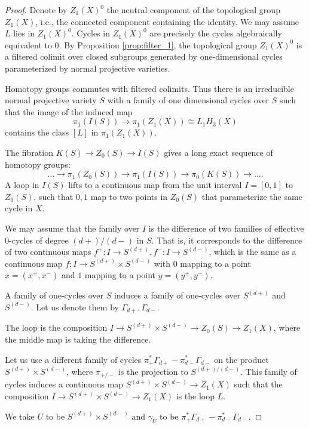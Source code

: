 \documentclass{amsart}
\theoremstyle{definition}
\theoremstyle{remark}
\begin{document}
\begin{proof}
Denote by $Z_1(X)^0$ the neutral component  of the topological group $Z_1(X)$, i.e., the connected component containing the identity.
We may assume $L$ lies in $Z_1(X)^0$.
Cycles in $Z_1(X)^0$ are precisely the cycles algebraically equivalent to $0$.
By Proposition \ref{prop:filter_1}, the topological group $Z_1(X)^0$ is a filtered colimit over closed subgroups generated by one-dimensional cycles parameterized by normal projective varieties.

Homotopy groups commutes with filtered colimits.
Thus there is an irreducible normal projective variety $S$ with a family of one dimensional cycles over $S$ such that the image of the induced map 
\[
 \pi_1(I(S)) \to \pi_1(Z_1(X)) \cong L_1H_{3}(X) 
\] 
contains the class $[L]$ in $\pi_1(Z_1(X))$.

The fibration $K(S) \to Z_0(S) \to I(S)$ gives a long exact sequence of homotopy groups:
\[
\ldots \to \pi_1(Z_0(S)) \to \pi_1(I(
S)) \to \pi_0(K(S)) \to \ldots.
\]
A loop in $I(S)$ lifts to a continuous map from the unit interval $I=[0, 1]$ to $Z_0(S)$, such that $0, 1$ map to two points in $Z_0(S)$ that parameterize the same cycle in $X$.
 
We may assume that the family over $I$ is the difference of two families of effective $0$-cycles of degree ${(d+)}/{(d-)} $ in $S$. That is, it corresponds to the difference of two continuous maps $f^+: I \to S^{(d+)}, f^-: I \to S^{(d-)}$, which is the same as a continuous map $f: I \to S^{(d+)} \times S^{(d-)}$ with $0$ mapping to a point $x=(x^+, x^-)$ and $1$ mapping to a point $y=(y^+, y^-)$. 

A family of one-cycles over $S$ induces a  family of one-cycles over $S^{(d+)}$ and $S^{(d-)}$. 
Let us denote them by $\Gamma_{d+}, \Gamma_{d-}$.

The loop is the composition $ I \to S^{(d+)} \times S^{(d-)} \to Z_0(S) \to Z_1(X)$, where the middle map is taking the difference.


Let us use a different family of cycles $\pi_+^* \Gamma_{d+}-\pi_{d-}^*\Gamma_{d-}$ on the product
$S^{(d+)} \times S^{(d-)}$, where $\pi_{+/-}$ is the projection to $S^{(d+)/(d-)}$.
This family of cycles induces a continuous map $S^{(d+)} \times S^{(d-)} \to Z_1(X)$ such that the composition $I \to S^{(d+)} \times S^{(d-)} \to Z_1(X)$ is the loop $L$.

We take $U$ to be $S^{(d+)} \times S^{(d-)}$ and $\gamma_U$ to be $\pi_+^* \Gamma_{d+}-\pi_{d-}^*\Gamma_{d-}$.
\end{proof}
\end{document}
